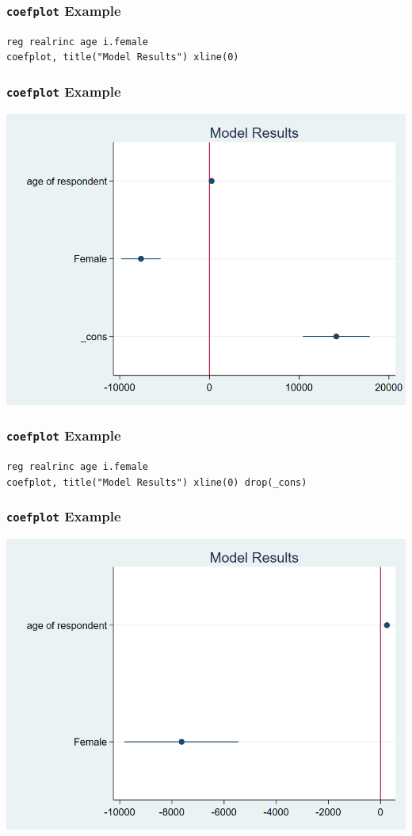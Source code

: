 \documentclass{beamer}
\begin{document}
\begin{frame}
	\frametitle{\texttt{coefplot} Example}
		\texttt{reg realrinc age i.female}\\
		\texttt{coefplot, title("Model Results") xline(0)}
\end{frame}

\begin{frame}
	\frametitle{\texttt{coefplot} Example}
		\includegraphics[scale=0.3]{MIVcoef01.png}
\end{frame}

\begin{frame}
	\frametitle{\texttt{coefplot} Example}
		\texttt{reg realrinc age i.female}\\
		\texttt{coefplot, title("Model Results") xline(0) drop(\_cons)}
\end{frame}

\begin{frame}
	\frametitle{\texttt{coefplot} Example}
		\includegraphics[scale=0.3]{MIVcoef02.png}
\end{frame}
\end{document}

